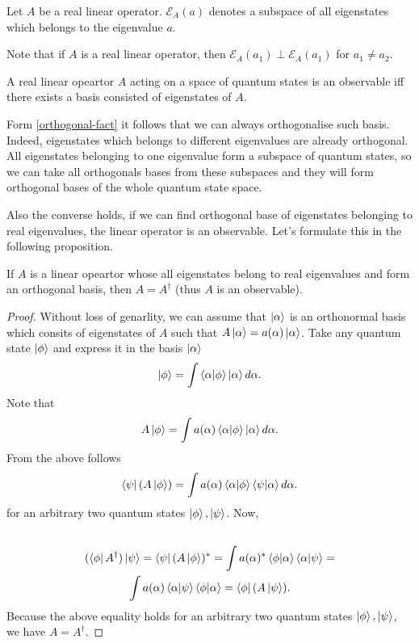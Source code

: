 \documentclass[main.tex]{subfiles}
\begin{document}
\begin{definition}
Let $A$ be a real linear operator.
$\mathcal{E}_A(a)$ denotes a subspace of all eigenstates which belongs to the eigenvalue $a$.
\end{definition}

Note that if $A$ is a real linear operator, then $\mathcal{E}_A(a_1) \perp \mathcal{E}_A(a_1)$ for $a_1 \not= a_2$.

\begin{definition}
A real linear opeartor $A$ acting on a space of quantum states is an observable iff there exists a basis consisted of eigenstates of $A$.  
\end{definition}

Form \ref{orthogonal-fact} it follows that we can always orthogonalise such basis. Indeed, eigenstates which belongs to different eigenvalues are already orthogonal. All eigenstates belonging to one eigenvalue form a subspace of quantum states, so we can take all orthogonals bases from these subspaces and they will form orthogonal bases of the whole quantum state space.

Also the converse holds, if we can find orthogonal base of eigenstates belonging to real eigenvalues, the linear operator is an observable. Let's formulate this in the following proposition.

\begin{proposition} If $A$ is a linear opeartor whose all eigenstates belong to real eigenvalues and form an orthogonal basis, then $A = A^\dagger$ (thus $A$ is an observable). 
\end{proposition}
\begin{proof}
Without loss of genarlity, we can assume that $\ket{\alpha}$ is an orthonormal basis which consits of eigenstates of $A$ such that $A \ket{\alpha} = a(\alpha)\ket{\alpha}$. Take any quantum state $\ket{\phi}$ and express it in the basis $\ket{\alpha}$
\begin{equation}
\ket{\phi} = \int \bra{\alpha}\ket{\phi}\ket{\alpha} d\alpha.
\end{equation}
Note that 
\begin{equation}
A\ket{\phi} = \int a(\alpha) \bra{\alpha}\ket{\phi}\ket{\alpha} d\alpha.
\end{equation}
From the above follows
\begin{equation}
\bra{\psi}(A\ket{\phi}) = \int a(\alpha) \bra{\alpha}\ket{\phi}\bra{\psi}\ket{\alpha} d\alpha.
\end{equation}
for an arbitrary two quantum states $\ket{\phi}, \ket{\psi}$.
Now, 
\begin{multline*}
\\
(\bra{\phi}A^\dagger)\ket{\psi} = \bra{\psi}(A\ket{\phi})^* = \int a(\alpha)^* \bra{\phi}\ket{\alpha}\bra{\alpha}\ket{\psi} = \\ 
\int a(\alpha) \bra{\alpha}\ket{\psi} \bra{\phi}\ket{\alpha} = \bra{\phi}(A\ket{\psi}).\\
\end{multline*}
Because the above equality holds for an arbitrary two quantum states $\ket{\phi}, \ket{\psi}$, we have $A = A^\dagger$.
\end{proof}
\end{document}
